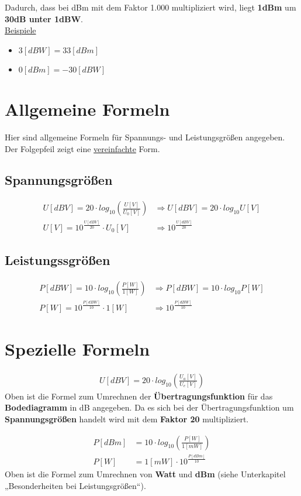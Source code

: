 Dadurch, dass bei dBm mit dem Faktor 1.000 multipliziert wird, liegt \textbf{1dBm} um \textbf{30dB unter 1dBW}.\\ 

\underline{Beispiele}
\begin{itemize}
    \item $3[dBW] = 33[dBm]$
    \item $0[dBm] = -30[dBW]$
\end{itemize}

\section{Allgemeine Formeln}
Hier sind allgemeine Formeln für Spannungs- und Leistungsgrößen angegeben. Der Folgepfeil zeigt eine \underline{vereinfachte} Form.

\subsection{Spannungsgrößen}
\begin{align}
    U[dBV]=20\cdot log_{10}(\frac{U[V]}{U_0[V]}) &\Rightarrow U[dBV]=20\cdot log_{10} U[V] \\
    U[V]=10^{\frac{U[dBV]}{20}}\cdot U_0[V] &\Rightarrow 10^{\frac{U[dBV]}{20}}
\end{align}

\subsection{Leistungssgrößen}
\begin{align}
    P[dBW]=10\cdot log_{10}(\frac{P[W]}{1[W]}) &\Rightarrow P[dBW]=10\cdot log_{10} P[W] \\
    P[W]=10^{\frac{P[dBW]}{10}}\cdot 1[W] &\Rightarrow 10^{\frac{P[dBW]}{10}}
\end{align}

\section{Spezielle Formeln}
\begin{align}
    U[dBV]=20\cdot log_{10}(\frac{U_a[V]}{U_e[V]})
\end{align}
Oben ist die Formel zum Umrechnen der \textbf{Übertragungsfunktion} für das \textbf{Bodediagramm} in dB angegeben. Da es sich bei der Übertragungsfunktion um \textbf{Spannungsgrößen} handelt wird mit dem \textbf{Faktor 20} multipliziert.

\begin{align}
    P[dBm]&=10\cdot log_{10}(\frac{P[W]}{1[mW]}) \\
    P[W]&=1[mW]\cdot 10^{\frac{P[dBm]}{10}}
\end{align}
Oben ist die Formel zum Umrechnen von \textbf{Watt} und \textbf{dBm} (siehe Unterkapitel „Besonderheiten bei Leistungsgrößen“).

